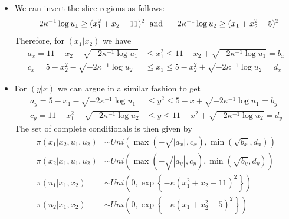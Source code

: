 \documentclass[notes=show,smaller]{beamer}
\begin{document}
\begin{frame}

\footnotesize
\begin{itemize}
\item
We can invert the slice regions  as follows:
$$
- 2 \kappa^{-1} \log u_1 \geq  ( x^2_1 + x_2 - 11 )^2 \; \; {\rm and} \; \; - 2 \kappa^{-1} \log u_2 \geq  ( x_1 + x_2^2 - 5 )^2
$$
Therefore, for $(x_1|x_2)$ we have
\begin{align*}
a_x = 11 - x_2 - \sqrt{ - 2 \kappa^{-1} \log u_1 } & \leq x^2_1 \leq  11 - x_2 + \sqrt{ - 2 \kappa^{-1} \log u_1 } =b_x\\
c_x = 5 - x_2^2 - \sqrt{ - 2 \kappa^{-1} \log u_2 }& \leq x_1 \leq  5 - x_2^2 + \sqrt{ - 2 \kappa^{-1} \log u_2 } =d_x
\end{align*}
\item
For $(y|x)$ we can argue in a similar fashion to get
\begin{align*}
a_y = 5 - x_1 - \sqrt{ - 2 \kappa^{-1} \log u_1 } & \leq y^2 \leq  5 - x + \sqrt{ - 2 \kappa^{-1} \log u_1 } =b_y\\
c_y = 11 - x_1^2 - \sqrt{ - 2 \kappa^{-1} \log u_2 }& \leq y \leq  11 - x^2 + \sqrt{ - 2 \kappa^{-1} \log u_2 } =d_y
\end{align*}
The set of complete conditionals is then given by
\begin{align*}
\pi( x_1| x_2 , u_1 , u_2 ) & \sim Uni \left ( \max \left (  - \sqrt{ | a_x| } ,c_x \right ) , \min \left ( \sqrt{b_x} , d_x \right ) \right )\\
\pi( x_2| x_1 , u_1 , u_2 ) & \sim Uni \left ( \max \left (  - \sqrt{ | a_y| } ,c_y \right ) , \min \left ( \sqrt{b_y} , d_y \right ) \right )\\
\pi( u_1 | x_1, x_2 ) & \sim Uni \left ( 0 , \exp \left \{ - \kappa ( x^2_1 + x_2 - 11 )^2 \right \} \right ) \\
\pi( u_2 | x_1 , x_2) & \sim Uni \left ( 0 , \exp \left \{ - \kappa ( x_1 + x_2^2 - 5 )^2 \right \} \right )
\end{align*}
\end{itemize}
\normalsize

\end{frame}
\end{document}
